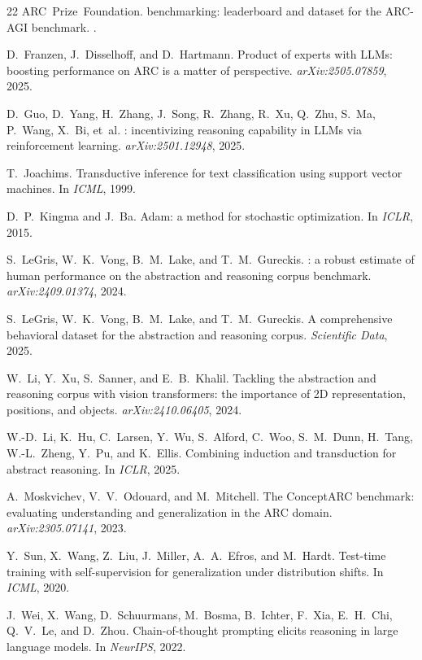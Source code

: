 \documentclass{article}
\begin{document}
{\begin{thebibliography}{22}
ARC~Prize~Foundation.
 benchmarking: leaderboard and dataset for the {ARC-AGI} benchmark.
.

D.~Franzen, J.~Disselhoff, and D.~Hartmann.
\newblock Product of experts with {LLMs}: boosting performance on {ARC} is a matter of perspective.
\newblock \textit{arXiv:2505.07859}, 2025.

D.~Guo, D.~Yang, H.~Zhang, J.~Song, R.~Zhang, R.~Xu, Q.~Zhu, S.~Ma, P.~Wang, X.~Bi, et~al.
: incentivizing reasoning capability in {LLMs} via reinforcement learning.
\newblock \textit{arXiv:2501.12948}, 2025.

T.~Joachims.
\newblock Transductive inference for text classification using support vector machines.
\newblock In \textit{ICML}, 1999.

D.~P.~Kingma and J.~Ba.
\newblock Adam: a method for stochastic optimization.
\newblock In \textit{ICLR}, 2015.

S.~LeGris, W.~K.~Vong, B.~M.~Lake, and T.~M.~Gureckis.
: a robust estimate of human performance on the abstraction and reasoning corpus benchmark.
\newblock \textit{arXiv:2409.01374}, 2024.

S.~LeGris, W.~K.~Vong, B.~M.~Lake, and T.~M.~Gureckis.
\newblock A comprehensive behavioral dataset for the abstraction and reasoning corpus.
\newblock \textit{Scientific Data}, 2025.

W.~Li, Y.~Xu, S.~Sanner, and E.~B.~Khalil.
\newblock Tackling the abstraction and reasoning corpus with vision transformers: the importance of {2D} representation, positions, and objects.
\newblock \textit{arXiv:2410.06405}, 2024.

W.-D.~Li, K.~Hu, C.~Larsen, Y.~Wu, S.~Alford, C.~Woo, S.~M.~Dunn, H.~Tang, W.-L.~Zheng, Y.~Pu, and K.~Ellis.
\newblock Combining induction and transduction for abstract reasoning.
\newblock In \textit{ICLR}, 2025.

A.~Moskvichev, V.~V.~Odouard, and M.~Mitchell.
\newblock The {ConceptARC} benchmark: evaluating understanding and generalization in the {ARC} domain.
\newblock \textit{arXiv:2305.07141}, 2023.

Y.~Sun, X.~Wang, Z.~Liu, J.~Miller, A.~A.~Efros, and M.~Hardt.
\newblock Test-time training with self-supervision for generalization under distribution shifts.
\newblock In \textit{ICML}, 2020.

J.~Wei, X.~Wang, D.~Schuurmans, M.~Bosma, B.~Ichter, F.~Xia, E.~H.~Chi, Q.~V.~Le, and D.~Zhou.
\newblock Chain-of-thought prompting elicits reasoning in large language models.
\newblock In \textit{NeurIPS}, 2022.

\end{thebibliography}
}
\end{document}
